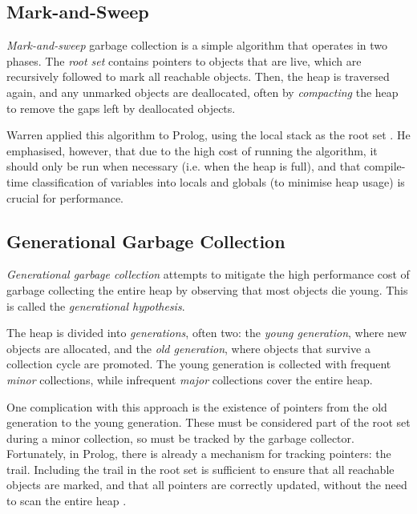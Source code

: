 \subsection{Mark-and-Sweep}

\label{sec:prep-mark-and-sweep}

\emph{Mark-and-sweep} garbage collection is a simple algorithm that operates in two phases. The \emph{root set} contains pointers to objects that are live, which are recursively followed to mark all reachable objects. Then, the heap is traversed again, and any unmarked objects are deallocated, often by \emph{compacting} the heap to remove the gaps left by deallocated objects.

Warren applied this algorithm to Prolog, using the local stack as the root set \cite{warrenImplementingPrologCompiling1977}. He emphasised, however, that due to the high cost of running the algorithm, it should only be run when necessary (i.e. when the heap is full), and that compile-time classification of variables into locals and globals (to minimise heap usage) is crucial for performance.

\subsection{Generational Garbage Collection}

\label{sec:generational-gc}

\emph{Generational garbage collection} attempts to mitigate the high performance cost of garbage collecting the entire heap by observing that most objects die young. This is called the \emph{generational hypothesis}.

The heap is divided into \emph{generations}, often two: the \emph{young generation}, where new objects are allocated, and the \emph{old generation}, where objects that survive a collection cycle are promoted. The young generation is collected with frequent \emph{minor} collections, while infrequent \emph{major} collections cover the entire heap.

One complication with this approach is the existence of pointers from the old generation to the young generation. These must be considered part of the root set during a minor collection, so must be tracked by the garbage collector. Fortunately, in Prolog, there is already a mechanism for tracking pointers: the trail. Including the trail in the root set is sufficient to ensure that all reachable objects are marked, and that all pointers are correctly updated, without the need to scan the entire heap \cite{bekkersDynamicMemoryManagement1992}.

